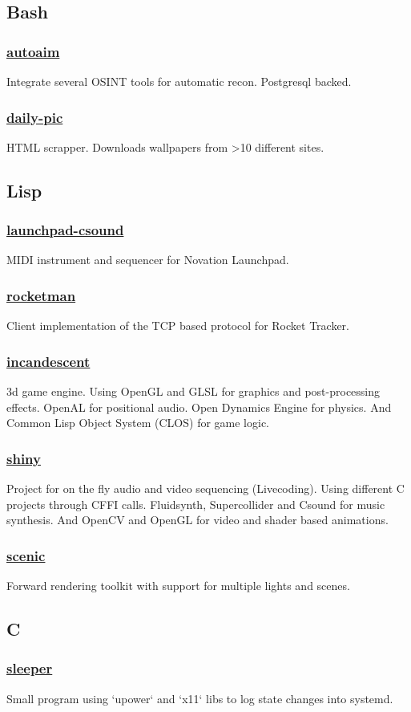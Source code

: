 \documentclass[11pt]{article}
\newcommand{\git}[2]{\href {https://github.com/azimut/{#2}} {#1}}
\begin{document}
\subsection{Bash}
\subsubsection{\git{autoaim}{autoaim}}
Integrate several OSINT tools for automatic recon. Postgresql backed.
\subsubsection{\git{daily-pic}{daily-pic}}
HTML scrapper. Downloads wallpapers from >10 different sites.

\subsection{Lisp}
\subsubsection{\git{launchpad-csound}{launchpad-csound}}
MIDI instrument and sequencer for Novation Launchpad.
\subsubsection{\git{rocketman}{rocketman}}
Client implementation of the TCP based protocol for Rocket Tracker.
\subsubsection{\git{incandescent}{incandescent}}
3d game engine. Using OpenGL and GLSL for graphics and post-processing effects. OpenAL for positional audio. Open Dynamics Engine for physics. And Common Lisp Object System (CLOS) for game logic.
\subsubsection{\git{shiny}{shiny}}
Project for on the fly audio and video sequencing (Livecoding). Using different C projects through CFFI calls. Fluidsynth, Supercollider and Csound for music synthesis. And OpenCV and OpenGL for video and shader based animations.
\subsubsection{\git{scenic}{scenic}}
Forward rendering toolkit with support for multiple lights and scenes.

\subsection{C}
\subsubsection{\git{sleeper}{sleeper}}
Small program using `upower` and `x11` libs to log state changes into systemd.
\end{document}
